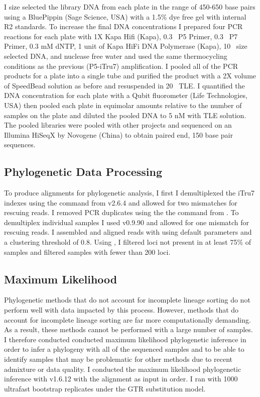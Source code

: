 I size selected the library DNA from each plate in the range of 450-650 base pairs using
a BluePippin (Sage Science, USA) with a 1.5\% dye free gel with internal R2 standards. 
To increase the final DNA concentrations I prepared four PCR reactions for each 
plate with 1X Kapa Hifi (Kapa), 0.3 \uM\ P5 Primer, 0.3 \uM\ P7 Primer, 0.3 mM dNTP, 
1 unit of Kapa HiFi DNA Polymerase (Kapa), 10 \uL\ size selected DNA, and 
nuclease free water and used the same thermocycling conditions as the previous
(P5-iTru7) amplification.
I pooled all of the PCR products for a plate into a single tube and purified 
the product with a 2X volume of SpeedBead solution as before and resuspended in 20 \uL\ TLE. 
I quantified the DNA concentration for each plate with a Qubit fluorometer 
(Life Technologies, USA) then pooled each plate in equimolar amounts relative 
to the number of samples on the plate and diluted the pooled DNA to 5 nM with
TLE solution. 
The pooled libraries were pooled with other projects and sequenced on an Illumina 
HiSeqX by Novogene (China) to obtain paired end, 150 base pair sequences. 

\subsection{Phylogenetic Data Processing}
To produce alignments for phylogenetic analysis, I first I demultiplexed the 
iTru7 indexes using the \processradtags command from \stacks v2.6.4 
\parencites{rochette2019} and allowed for two mismatches for rescuing reads.
I removed PCR duplicates using the the \clonefilter command from \stacks.
To demultiplex individual samples I used \pyrad v0.9.90 and allowed for one 
mismatch for rescuing reads. 
I assembled and aligned reads with \pyrad using default parameters and a 
clustering threshold of 0.8. 
Using \pyrad, I filtered loci not present in at least 75\% of samples 
and filtered samples with fewer than 200 loci.

\subsection{Maximum Likelihood}
Phylogenetic methods that do not account for incomplete lineage sorting  
do not perform well with data impacted by this process.
However, methods that do account for incomplete lineage sorting are far more 
computationally demanding.
As a result, these methods cannot be performed with a large number of samples.
I therefore conducted conducted maximum likelihood phylogenetic inference in  
order to infer a phylogeny with all of the sequenced samples and to be able  
to identify samples that may be problematic for other methods due to recent 
admixture or data quality. 
I conducted the maximum likelihood phylogenetic inference with \iqtree 
v1.6.12 \parencite{nguyen2015} with the \pyrad alignment as input in order. 
I ran \iqtree with 1000 ultrafast bootstrap replicates \parencite{hoang2018}
under the GTR substitution model.

